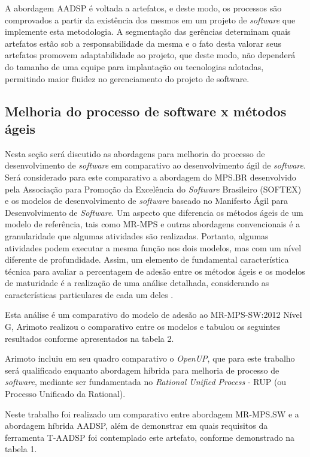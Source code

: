 \documentclass{acm_proc_article-sp}
\begin{document}
A abordagem AADSP é voltada a artefatos, e deste modo, os processos são comprovados a partir da existência dos mesmos em um projeto de \textit{software} que implemente esta metodologia. A segmentação das gerências determinam quais artefatos estão sob a responsabilidade da mesma e o fato desta valorar seus artefatos promovem adaptabilidade ao projeto, que deste modo, não dependerá do tamanho de uma equipe para implantação ou tecnologias adotadas, permitindo maior fluidez no gerenciamento do projeto de software.

\subsection{Melhoria do processo de software x métodos ágeis}
Nesta seção será discutido as abordagens para melhoria do processo de desenvolvimento de \textit{software} em comparativo ao desenvolvimento ágil de \textit{software}. Será considerado para este comparativo a abordagem do MPS.BR desenvolvido pela Associação para Promoção da Excelência do \textit{Software} Brasileiro (SOFTEX) e os modelos de desenvolvimento de \textit{software} baseado no Manifesto Ágil para Desenvolvimento de \textit{Software}. Um aspecto que diferencia os métodos ágeis de um modelo de referência, tais como MR-MPS e
outras abordagens convencionais é a granularidade que algumas atividades são realizadas. Portanto, algumas atividades podem executar a mesma função nos dois modelos, mas com um nível diferente de profundidade. Assim, um elemento de fundamental
característica técnica para avaliar a percentagem de adesão entre os métodos ágeis e os modelos de maturidade é a realização de uma análise detalhada, considerando as características particulares de cada um deles \cite{Arimoto:melhoria}.  

Esta análise é um comparativo do modelo de adesão ao MR-MPS-SW:2012 Nível G, Arimoto \cite{Arimoto:melhoria} realizou o comparativo entre os modelos e tabulou os seguintes resultados conforme apresentados na tabela 2.

Arimoto \cite{Arimoto:melhoria} incluiu em seu quadro comparativo o \textit{OpenUP}, que para este trabalho será qualificado enquanto abordagem híbrida para melhoria de processo de \textit{software}, mediante ser fundamentada no \textit{Rational Unified Process} - RUP (ou Processo Unificado da Rational).

Neste trabalho foi realizado um comparativo entre abordagem MR-MPS.SW e a abordagem híbrida AADSP, além de demonstrar em quais requisitos da ferramenta T-AADSP foi contemplado este artefato, conforme demonstrado na tabela 1.
\end{document}
